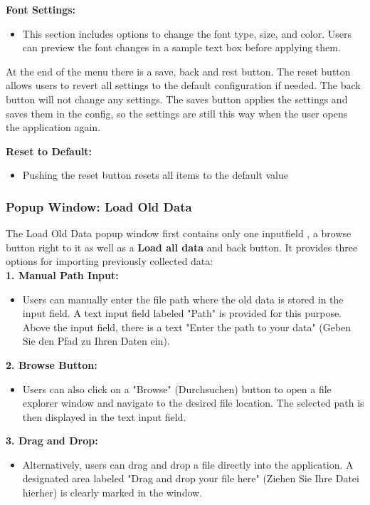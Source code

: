 \documentclass[]{scrreprt}
\begin{document}
\textbf{Font Settings:}
\begin{itemize}
    \item This section includes options to change the font type, size, and color. Users can preview the font changes in a sample text box before applying them.
\end{itemize}


At the end of the menu there is a save, back and rest button. The reset button allows users to revert all settings to the default configuration if needed. The back button will not change any settings.
The saves button applies the settings and saves them in the config, so the settings are still this way when the user opens the application again.


\textbf{Reset to Default:}
\begin{itemize}
    \item Pushing the reset button resets all items to the default value
\end{itemize}


\subsubsection{Popup Window: Load Old Data}\label{cap:PopupWindowloadoldata}


The Load Old Data popup window first contains only one inputfield , a browse button right to it as well as a \textbf{Load all data} and back button.
It provides three options for importing previously collected data: \\


\textbf{1. Manual Path Input:}
\begin{itemize}
    \item Users can manually enter the file path where the old data is stored in the input field.
    A text input field labeled "Path" is provided for this purpose.
     Above the input field, there is a text "Enter the path to your data" (Geben Sie den Pfad zu Ihren Daten ein).
\end{itemize}


\textbf{2. Browse Button:}
\begin{itemize}
    \item Users can also click on a "Browse" (Durchsuchen) button to open a file explorer window and navigate to the desired file location.
     The selected path is then displayed in the text input field.
\end{itemize}


\textbf{3. Drag and Drop:}
\begin{itemize}
    \item Alternatively, users can drag and drop a file directly into the application.
     A designated area labeled "Drag and drop your file here" (Ziehen Sie Ihre Datei hierher) is clearly marked in the window.
\end{itemize}
\end{document}
